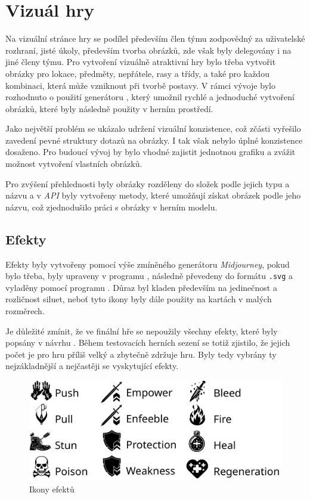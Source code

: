 \section{Vizuál hry}
\label{subsec:game_visuals}

Na vizuální stránce hry se podílel především člen týmu zodpovědný za uživatelské rozhraní, jisté úkoly, především tvorba obrázků, zde však byly delegovány i na jiné členy týmu. Pro vytvoření vizuálně atraktivní hry bylo třeba vytvořit obrázky pro lokace, předměty, nepřátele, rasy a třídy, a také pro každou kombinaci, která může vzniknout při tvorbě postavy. V rámci vývoje bylo rozhodnuto o použití generátoru , který umožnil rychlé a jednoduché vytvoření obrázků, které byly následně použity v herním prostředí.

Jako největší problém se ukázalo udržení vizuální konzistence, což zčásti vyřešilo zavedení pevné struktury dotazů na obrázky. I tak však nebylo úplné konzistence dosaženo. Pro budoucí vývoj by bylo vhodné zajistit jednotnou grafiku a zvážit možnost vytvoření vlastních obrázků.

Pro zvýšení přehlednosti byly obrázky rozděleny do složek podle jejich typu a názvu a v \textit{API} byly vytvořeny metody, které umožňují získat obrázek podle jeho názvu, což zjednodušilo práci s obrázky v herním modelu.

\subsection{Efekty}
\label{subsec:effects}

Efekty  byly vytvořeny pomocí výše zmíněného generátoru \textit{Midjourney}, pokud bylo třeba, byly upraveny v programu , následně převedeny do formátu \texttt{.svg} a vyladěny pomocí programu . Důraz byl kladen především na jedinečnost a rozličnost siluet, neboť tyto ikony byly dále použity na kartách v malých rozměrech.

Je důležité zmínit, že ve finální hře se nepoužily všechny efekty, které byly popsány v návrhu . Během testovacích herních sezení se totiž zjistilo, že jejich počet je pro hru příliš velký a zbytečně zdržuje hru. Byly tedy vybrány ty nejzákladnější a nejčastěji se vyskytující efekty.

\begin{figure}[H]
    \centering
    \includegraphics[scale=0.7]{figures/images/effects.pdf}
    \caption{Ikony efektů}
    \label{fig:effects}
\end{figure}

